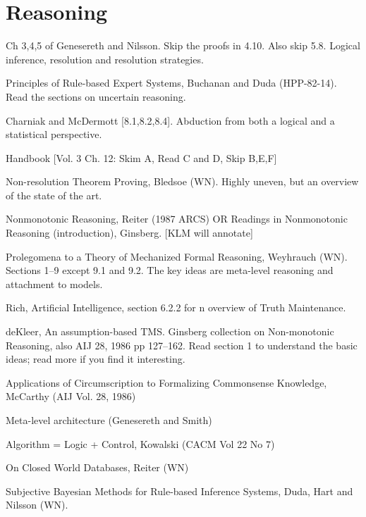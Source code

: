 \section{Reasoning}
\label{sec:reasoning}

\begin{required}

  \paper Ch 3,4,5 of Genesereth and Nilsson.  Skip the proofs in 4.10.
Also skip 5.8.  Logical inference, resolution and resolution
strategies.

  \paper Principles of Rule-based Expert Systems, Buchanan and Duda
(HPP-82-14).  Read the sections on uncertain reasoning.

  \paper Charniak and McDermott [8.1,8.2,8.4].  Abduction from both a
logical and a statistical perspective.

  \paper  Handbook [Vol. 3 Ch. 12: Skim A, Read C and D, Skip B,E,F]

  \paper Non-resolution Theorem Proving, Bledsoe (WN).  Highly uneven,
but an overview of the state of the art.

  \paper Nonmonotonic Reasoning, Reiter (1987 ARCS) OR Readings in
Nonmonotonic Reasoning (introduction), Ginsberg.  [KLM will annotate]

  \paper Prolegomena to a Theory of Mechanized Formal Reasoning,
Weyhrauch (WN). Sections 1--9 except 9.1 and 9.2.  The key ideas are
meta-level reasoning and attachment to models.

\paper Rich, Artificial Intelligence, section 6.2.2 for n overview of
Truth Maintenance.

\paper deKleer, An assumption-based TMS.  Ginsberg collection on
Non-monotonic Reasoning, also AIJ 28, 1986 pp 127--162.  Read section
1 to understand the basic ideas; read more if you find it interesting.

\end{required}

\begin{optional}

  \paper  Applications of Circumscription to Formalizing Commonsense Knowledge, 
        McCarthy (AIJ Vol. 28, 1986)

  \paper  Meta-level architecture (Genesereth and Smith)

  \paper  Algorithm = Logic + Control, Kowalski  (CACM Vol 22 No 7)

  \paper  On Closed World Databases, Reiter (WN)

  \paper Subjective Bayesian Methods for Rule-based Inference Systems,
Duda, Hart and Nilsson (WN).

\end{optional}

